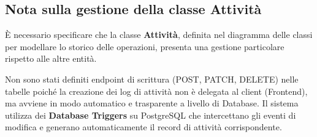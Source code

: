 \begin{table}[H]
\centering
{}
\caption{API della classe TicketDiSupporto (Gestione e Operatività)}
\label{tab:api_ticket_gestione}
\end{table}


\vspace{1em} %

\subsection*{Nota sulla gestione della classe Attività}
È necessario specificare che la classe \textbf{Attività}, definita nel diagramma delle classi per modellare lo storico delle operazioni, presenta una gestione particolare rispetto alle altre entità.

Non sono stati definiti endpoint di scrittura (POST, PATCH, DELETE) nelle tabelle poiché la creazione dei log di attività non è delegata al client (Frontend), ma avviene in modo automatico e trasparente a livello di Database. Il sistema utilizza dei \textbf{Database Triggers} su PostgreSQL che intercettano gli eventi di modifica e generano automaticamente il record di attività corrispondente.

